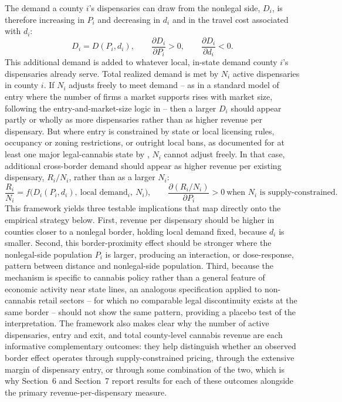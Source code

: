 \documentclass[12pt]{article}
\begin{document}
The demand a county $i$'s dispensaries can draw from the nonlegal side, $D_i$, is therefore increasing in
$P_i$ and decreasing in $d_i$ and in the travel cost associated with $d_i$:
\begin{equation}
D_i = D(P_i, d_i), \qquad \frac{\partial D_i}{\partial P_i} > 0, \qquad \frac{\partial D_i}{\partial d_i} < 0.
\end{equation}
This additional demand is added to whatever local, in-state demand county $i$'s dispensaries already serve.
Total realized demand is met by $N_i$ active dispensaries in county $i$. If $N_i$ adjusts freely to meet
demand -- as in a standard model of entry where the number of firms a market supports rises with market
size, following the entry-and-market-size logic in \citet{BresnahanReiss1991} -- then a larger $D_i$ should
appear partly or wholly as more dispensaries rather than as higher revenue per dispensary. But where entry
is constrained by state or local licensing rules, occupancy or zoning restrictions, or outright local bans,
as documented for at least one major legal-cannabis state by \citet{HollenbeckUetake2021}, $N_i$ cannot
adjust freely. In that case, additional cross-border demand should appear as higher revenue per existing
dispensary, $R_i / N_i$, rather than as a larger $N_i$:
\begin{equation}
\frac{R_i}{N_i} = f\big(D_i(P_i, d_i),\ \text{local demand}_i,\ N_i\big), \qquad
\frac{\partial (R_i/N_i)}{\partial P_i} > 0 \ \text{when } N_i \text{ is supply-constrained}.
\end{equation}
This framework yields three testable implications that map directly onto the empirical strategy below.
First, revenue per dispensary should be higher in counties closer to a nonlegal border, holding local
demand fixed, because $d_i$ is smaller. Second, this border-proximity effect should be stronger where the
nonlegal-side population $P_i$ is larger, producing an interaction, or dose-response, pattern between
distance and nonlegal-side population. Third, because the mechanism is specific to cannabis policy rather
than a general feature of economic activity near state lines, an analogous specification applied to
non-cannabis retail sectors -- for which no comparable legal discontinuity exists at the same border --
should not show the same pattern, providing a placebo test of the interpretation. The framework also makes
clear why the number of active dispensaries, entry and exit, and total county-level cannabis revenue are
each informative complementary outcomes: they help distinguish whether an observed border effect operates
through supply-constrained pricing, through the extensive margin of dispensary entry, or through some
combination of the two, which is why Section~6 and Section~7 report results for each of these outcomes
alongside the primary revenue-per-dispensary measure.
\end{document}
